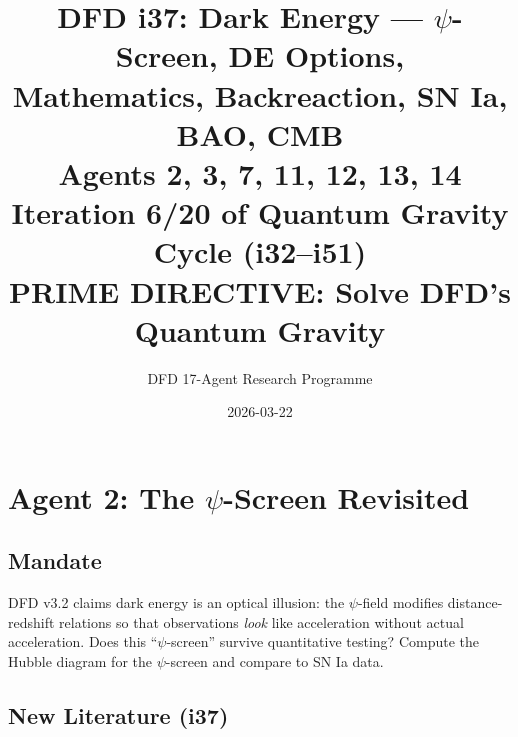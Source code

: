 \documentclass[11pt,a4paper]{article}
\title{DFD i37: Dark Energy --- $\psi$-Screen, DE Options,\\Mathematics, Backreaction, SN Ia, BAO, CMB\\[6pt]
\large Agents 2, 3, 7, 11, 12, 13, 14\\[6pt]
\normalsize Iteration 6/20 of Quantum Gravity Cycle (i32--i51)\\
PRIME DIRECTIVE: Solve DFD's Quantum Gravity}
\author{DFD 17-Agent Research Programme}
\date{2026-03-22}
\begin{document}
\maketitle
\tableofcontents
\newpage

\section{Agent 2: The $\psi$-Screen Revisited}
\label{sec:agent2}

\subsection{Mandate}

DFD v3.2 claims dark energy is an optical illusion: the $\psi$-field modifies distance-redshift relations so that observations \emph{look} like acceleration without actual acceleration. Does this ``$\psi$-screen'' survive quantitative testing? Compute the Hubble diagram for the $\psi$-screen and compare to SN Ia data.

\subsection{New Literature (i37)}
\end{document}
